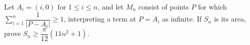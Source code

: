 Let $A_i=(i,0)$ for $1\le i\le n$, and let $M_n$ consist of points $P$ for which $\sum_{i=1}^n\dfrac{1}{|P-A_i|}\ge1$, interpreting a term at $P=A_i$ as infinite. If $S_n$ is its area, prove $S_n\ge\dfrac{\pi}{12}(11n^2+1)$.
